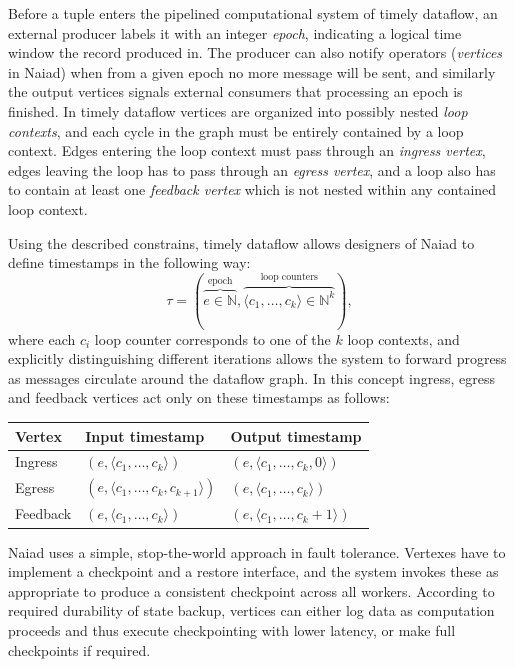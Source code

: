Before a tuple enters the pipelined computational system of timely dataflow, an external producer labels it with an integer \textit{epoch}, indicating a 
logical time window the record produced in. The producer can also notify operators (\textit{vertices} in Naiad) when from a given epoch no more message will be sent, and similarly the output vertices signals external consumers that processing an epoch is finished. In timely dataflow vertices are organized into possibly nested \textit{loop contexts}, and each cycle in the graph must be entirely contained by a loop context. Edges entering the loop context must pass through an \textit{ingress vertex}, edges leaving the loop has to pass through an \textit{egress vertex}, and a loop also has to contain at least one \textit{feedback vertex} which is not nested within any contained loop context.

Using the described constrains, timely dataflow allows designers of Naiad to define timestamps in the following way:
\begin{equation}
\tau=(\overbrace{e \in \mathbb{N}}^\text{epoch},\overbrace{\langle c_1,\dots,c_k \rangle \in \mathbb{N}^{k}}^\text{loop counters} ),
\end{equation} 
where each $c_i$ loop counter corresponds to one of the $k$ loop contexts, and explicitly distinguishing different iterations allows the system to forward progress as messages circulate around the dataflow graph. In this concept ingress, egress and feedback vertices act only on these timestamps as follows:
\begin{tabular}{l l l}
Vertex & Input timestamp & Output timestamp \\
\hline
Ingress & $(e,\langle c_1,\dots,c_k \rangle)$ & $(e,\langle c_1,\dots,c_k,0 \rangle)$\\
Egress & $(e,\langle c_1,\dots,c_k, c_{k+1} \rangle)$ & $(e,\langle c_1,\dots,c_k \rangle)$\\
Feedback & $(e,\langle c_1,\dots,c_k\rangle)$ & $(e,\langle c_1,\dots,c_k+1 \rangle)$\\
\end{tabular} 
Naiad uses a simple, stop-the-world approach in fault tolerance. Vertexes have to implement a checkpoint and a restore interface, and the system invokes these as appropriate to produce a consistent checkpoint across all workers. According to required durability of state backup, vertices can either log data as computation proceeds and thus execute checkpointing with lower latency, or make full checkpoints if required.

